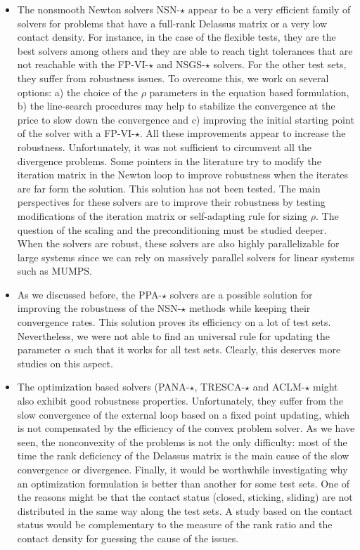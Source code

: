 \begin{itemize}
\item The nonsmooth Newton solvers {\sf NSN-$\star$} appear to be a very efficient family of solvers for problems that have a full-rank Delassus matrix or a very low contact density. For instance, in the case of the flexible tests, they are the best solvers among others and they are able to reach tight tolerances that are not reachable with the {\sf FP-VI-$\star$}  and {\sf NSGS-$\star$} solvers. For the other test sets, they suffer from robustness issues. To overcome this, we work on several options:  a) the choice of the $\rho$ parameters in the equation based formulation, b) the line-search procedures may help to stabilize the convergence at the price to slow down the convergence and c) improving the initial starting point of the solver with a {\sf FP-VI-$\star$}. All these improvements appear to increase the robustness. Unfortunately, it was not sufficient to circumvent all the divergence problems. Some pointers in the literature try to modify the iteration matrix in the Newton loop to improve robustness when the iterates are far form the solution. This solution has not been tested. The main perspectives for these solvers are to improve their robustness by testing modifications of the iteration matrix or self-adapting rule for sizing $\rho$. The question of the scaling and the preconditioning must be studied deeper. When the solvers are robust, these solvers are also highly parallelizable for large systems since we can rely on massively parallel solvers for linear systems such as MUMPS.

\item As we discussed before, the {\sf PPA-$\star$} solvers are a possible solution for improving the robustness of the {\sf NSN-$\star$} methods while keeping their convergence rates. This solution proves its efficiency on a lot of test sets. Nevertheless, we were not able to find an universal rule for updating the parameter $\alpha$ such that it works for all test sets. Clearly, this deserves more studies  on this aspect.

\item The optimization based solvers ({\sf PANA-$\star$, TRESCA-$\star$ and ACLM-$\star$} might  also exhibit good robustness properties. Unfortunately, they suffer from the slow convergence of the external loop based on a fixed point updating, which is not compensated by the efficiency of the convex problem solver. As we have seen, the nonconvexity of the problems is not the only difficulty: most of the time the rank deficiency of the Delassus matrix is the main cause of the slow convergence or divergence. Finally, it would be worthwhile investigating why an optimization formulation is better than another for some test sets. One of the reasons might be that the contact status (closed, sticking, sliding) are not distributed in the same  way along the test sets. A study based on the contact status would be complementary to the measure of the rank ratio and the contact density for guessing the cause of the issues.


\end{itemize}




